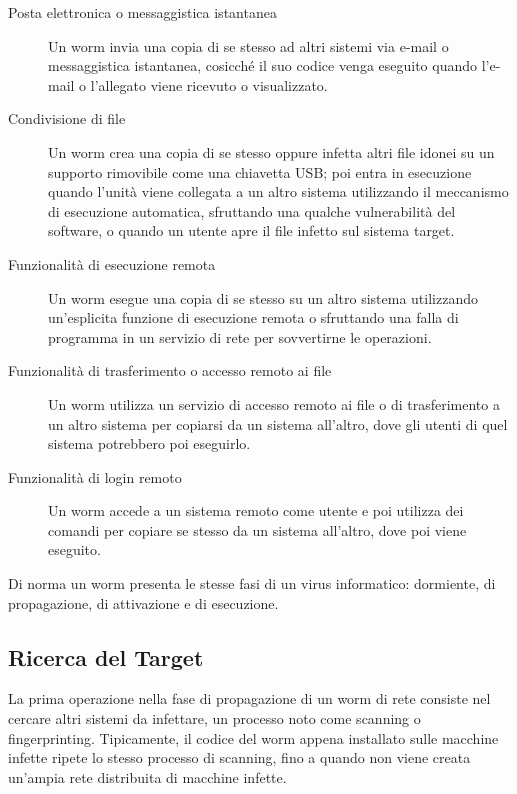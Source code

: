 \begin{description}
    \item[Posta elettronica o messaggistica istantanea] Un worm invia una copia di se stesso ad altri sistemi via e-mail o messaggistica istantanea, cosicché il suo codice venga eseguito quando l'e-mail o l'allegato viene ricevuto o visualizzato.
    
    \item[Condivisione di file] Un worm crea una copia di se stesso oppure infetta altri file idonei su un supporto rimovibile come una chiavetta USB; poi entra in esecuzione quando l'unità viene collegata a un altro sistema utilizzando il meccanismo di esecuzione automatica, sfruttando una qualche vulnerabilità del software, o quando un utente apre il file infetto sul sistema target.
    
    \item[Funzionalità di esecuzione remota] Un worm esegue una copia di se stesso su un altro sistema utilizzando un'esplicita funzione di esecuzione remota o sfruttando una falla di programma in un servizio di rete per sovvertirne le operazioni.
    
    \item[Funzionalità di trasferimento o accesso remoto ai file] Un worm utilizza un servizio di accesso remoto ai file o di trasferimento a un altro sistema per copiarsi da un sistema all'altro, dove gli utenti di quel sistema potrebbero poi eseguirlo.
    
    \item[Funzionalità di login remoto] Un worm accede a un sistema remoto come utente e poi utilizza dei comandi per copiare se stesso da un sistema all'altro, dove poi viene eseguito.
\end{description}

Di norma un worm presenta le stesse fasi di un virus informatico: dormiente, di propagazione, di attivazione e di esecuzione.

\subsection{Ricerca del Target}

La prima operazione nella fase di propagazione di un worm di rete consiste nel cercare altri sistemi da infettare, un processo noto come scanning o fingerprinting. Tipicamente, il codice del worm appena installato sulle macchine infette ripete lo stesso processo di scanning, fino a quando non viene creata un'ampia rete distribuita di macchine infette.


